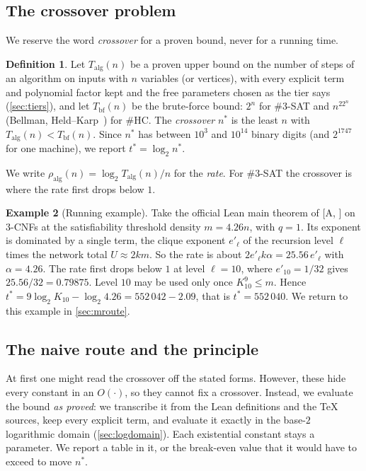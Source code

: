 \documentclass[10pt]{amsart}
\theoremstyle{definition}
\newtheorem{definition}{Definition}[section]
\newtheorem{example}[definition]{Example}
\theoremstyle{remark}
\numberwithin{equation}{section}
\newcommand{\A}[1][]{\textup{[A\if\relax\detokenize{#1}\relax\else, #1\fi]}}
\newcommand{\HC}{\#\mathrm{HC}}
\newcommand{\tst}{t^{*}}
\newcommand{\nst}{n^{*}}
\begin{document}
\subsection{The crossover problem}
We reserve the word \emph{crossover} for a proven bound, never for a running time.

\begin{definition}\label{def:cross}
Let $T_{\mathrm{alg}}(n)$ be a proven upper bound on the number of steps of an algorithm on inputs
with $n$ variables (or vertices), with every explicit term and polynomial factor kept and the free
parameters chosen as the tier says (\cref{sec:tiers}), and let $T_{\mathrm{bf}}(n)$ be the
brute-force bound: $2^n$ for $\#3$-SAT and $n^22^n$ (Bellman, Held--Karp~\cite{Bellman62,HeldKarp62})
for $\HC$. The \emph{crossover} $\nst$ is the least $n$ with $T_{\mathrm{alg}}(n)<T_{\mathrm{bf}}(n)$.
Since $\nst$ has between $10^3$ and $10^{14}$ binary digits (and $2^{1747}$ for one machine), we report $\tst=\log_2\nst$.
\end{definition}

We write $\rho_{\mathrm{alg}}(n)=\log_2T_{\mathrm{alg}}(n)/n$ for the \emph{rate}. For $\#3$-SAT
the crossover is where the rate first drops below $1$.

\begin{example}[Running example]\label{ex:running}
Take the official Lean main theorem of \A{} on $3$-CNFs at the satisfiability threshold density
$m=4.26n$, with $q=1$. Its exponent is dominated by a single term, the clique exponent $e'_\ell$ of
the recursion level $\ell$ times the network total $U\approx2km$. So the rate is about
$2e'_\ell k\alpha=25.56\,e'_\ell$ with $\alpha=4.26$. The rate first drops below $1$ at level
$\ell=10$, where $e'_{10}=1/32$ gives $25.56/32=0.79875$. Level $10$ may be used only once
$K_{10}^9\le m$. Hence $\tst=9\log_2K_{10}-\log_2 4.26=552\,042-2.09$, that is $\tst=552\,040$. We
return to this example in \cref{sec:mroute}.
\end{example}

\subsection{The naive route and the principle}
At first one might read the crossover off the stated forms. However, these hide every constant in
an $O(\cdot)$, so they cannot fix a crossover. Instead, we evaluate the bound \emph{as proved}: we
transcribe it from the Lean definitions and the \TeX{} sources, keep every explicit term, and
evaluate it exactly in the base-$2$ logarithmic domain (\cref{sec:logdomain}). Each existential
constant stays a parameter. We report a table in it, or the break-even value that it would have to
exceed to move $\nst$.
\end{document}
